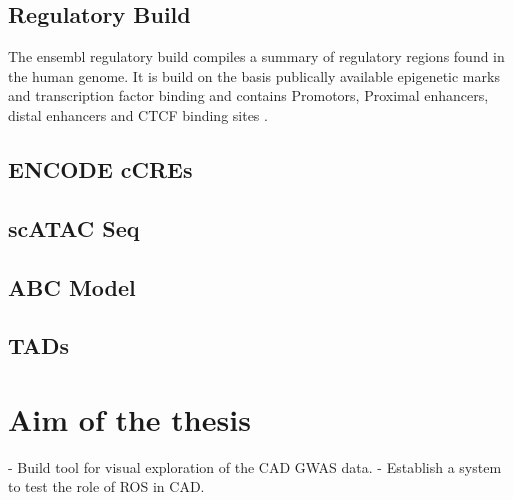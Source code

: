     \subsection{Regulatory Build}
    The ensembl regulatory build compiles a summary of regulatory regions found in the human genome. It is build on the basis publically available epigenetic marks and transcription factor binding and contains Promotors, Proximal enhancers, distal enhancers and CTCF binding sites \cite{zerbinoEnsemblRegulatoryBuild2015}.

    \subsection{ENCODE cCREs}
    \cite{SCREENSearchCandidate, mooreExpandedEncyclopaediasDNA2020}

    \subsection{scATAC Seq}
    \cite{buenrostroTranspositionNativeChromatin2013} %
    \cite{turnerCellspecificChromatinLandscape2021a} %
    \cite{zhangSinglecellAtlasChromatin2021} %

    \subsection{ABC Model}
    \cite{fulcoActivitybycontactModelEnhancer2019a, nasserGenomewideEnhancerMaps2021a}

    \subsection{TADs}
    \cite{wang3DGenomeBrowser2018}

\section{Aim of the thesis}
\label{sec:Aim}
- Build tool for visual exploration of the CAD GWAS data.
- Establish a system to test the role of ROS in CAD.
